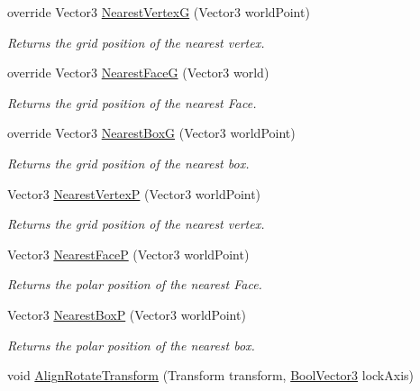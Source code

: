 \begin{DoxyCompactItemize}
override Vector3 \hyperlink{class_g_f_polar_grid_aa119074284b649c45ee9b1bb80153d4d_aa119074284b649c45ee9b1bb80153d4d}{Nearest\+Vertex\+G} (Vector3 world\+Point)
\begin{DoxyCompactList}\small\item\em Returns the grid position of the nearest vertex.\end{DoxyCompactList}\item 
override Vector3 \hyperlink{class_g_f_polar_grid_a14f3e5fe0e7db4b49bae10a146a9e5f6_a14f3e5fe0e7db4b49bae10a146a9e5f6}{Nearest\+Face\+G} (Vector3 world)
\begin{DoxyCompactList}\small\item\em Returns the grid position of the nearest Face.\end{DoxyCompactList}\item 
override Vector3 \hyperlink{class_g_f_polar_grid_abdc5c38b32d8fe3d6610127b54b89093_abdc5c38b32d8fe3d6610127b54b89093}{Nearest\+Box\+G} (Vector3 world\+Point)
\begin{DoxyCompactList}\small\item\em Returns the grid position of the nearest box.\end{DoxyCompactList}\item 
Vector3 \hyperlink{class_g_f_polar_grid_a267e38d14acaffe3e98bac47c75eb52d_a267e38d14acaffe3e98bac47c75eb52d}{Nearest\+Vertex\+P} (Vector3 world\+Point)
\begin{DoxyCompactList}\small\item\em Returns the grid position of the nearest vertex.\end{DoxyCompactList}\item 
Vector3 \hyperlink{class_g_f_polar_grid_a2d1331fb80b8029fe7c06c72c4a16077_a2d1331fb80b8029fe7c06c72c4a16077}{Nearest\+Face\+P} (Vector3 world\+Point)
\begin{DoxyCompactList}\small\item\em Returns the polar position of the nearest Face.\end{DoxyCompactList}\item 
Vector3 \hyperlink{class_g_f_polar_grid_a06654388a9f53f5e56971f7c8b7f40ad_a06654388a9f53f5e56971f7c8b7f40ad}{Nearest\+Box\+P} (Vector3 world\+Point)
\begin{DoxyCompactList}\small\item\em Returns the polar position of the nearest box.\end{DoxyCompactList}\item 
void \hyperlink{class_g_f_polar_grid_a14f45c2312bfe475e588d128dc108b0c_a14f45c2312bfe475e588d128dc108b0c}{Align\+Rotate\+Transform} (Transform transform, \hyperlink{class_grid_framework_1_1_vectors_1_1_bool_vector3}{Bool\+Vector3} lock\+Axis)

\end{DoxyCompactItemize}
